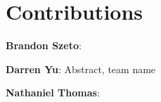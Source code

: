 \section*{Contributions}

\textbf{Brandon Szeto}:

\textbf{Darren Yu}: Abstract, team name

\textbf{Nathaniel Thomas}:
